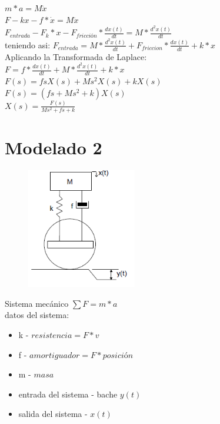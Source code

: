 \documentclass[
	12pt, %
]{fphw}
\begin{document}
$m*a = M\ddot{x}$ \\

$F - kx - f*\dot{x} = M\ddot{x}$ \\
$F_{entrada} - F_{k}*x - F_{fricción}*\frac{dx(t)}{dt} = M*\frac{d^2 x(t)}{dt}$ \\

teniendo asi: $F_{entrada} = M*\frac{d^2 x(t)}{dt} + F_{friccion} * \frac{dx(t)}{dt} + k*x$ \\

\newpage
Aplicando la Transformada de Laplace: \\
$F=f*\frac{d x(t)}{dt} + M * \frac{d^{2} x(t)}{dt} + k*x$ \\

$F(s) = fsX(s)+Ms^{2}X(s)+kX(s)$ \\

$F(s) = (fs+Ms^{2}+k)X(s)$ \\

$X(s) = \frac{F(s)}{Ms^{2}+fs+k}$ \\



\newpage
\section*{{\color{Apricot}Modelado 2}}

\begin{figure}[H]
  \centering
  \includegraphics[scale=0.6]{images/p2.png}
\end{figure}

Sistema mecánico $\sum F=m*a$ \\

datos del sistema:
\begin{itemize}
\item k - $resistencia = F*v$ 
\item f - $amortiguador = F*posición$
\item m - $masa$
\item entrada del sistema - bache $y(t)$
\item salida del sistema - $x(t)$
\end{itemize}
\end{document}
